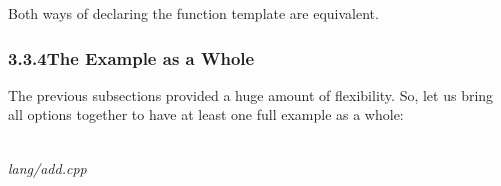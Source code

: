Both ways of declaring the function template are equivalent.

\subsubsection*{ 3.3.4\hspace{0.2cm}The Example as a Whole}

The previous subsections provided a huge amount of flexibility. So, let us bring all options together to have at least one full example as a whole:


\noindent
\hspace*{\fill} \\ %
\textit{lang/add.cpp}

